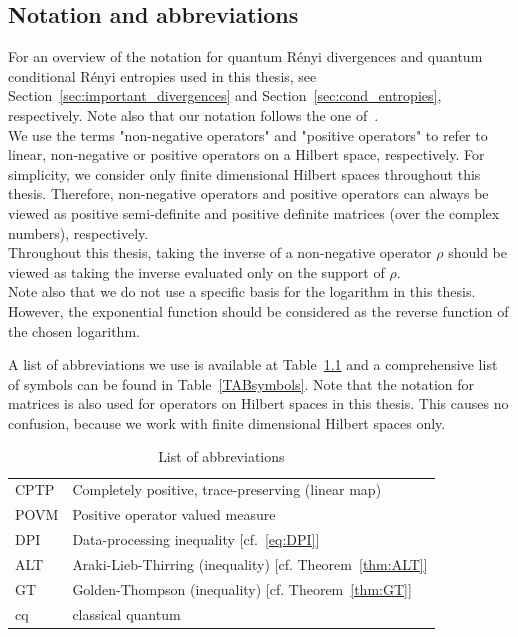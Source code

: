 \documentclass[11pt,a4paper,twoside]{report}
\newcommand{\+}{\textnormal{+} }
\theoremstyle{definition}
\numberwithin{equation}{chapter}
\begin{document}
\begin{appendix}
\chapter{Notation and abbreviations} \label{APPnoation}

For an overview of the notation for quantum R\'enyi divergences and quantum conditional R\'enyi entropies used in this thesis, see Section~\ref{sec:important_divergences} and  Section~\ref{sec:cond_entropies}, respectively. Note also that our notation follows the one of~\cite{tomamichel_quantum_2016}. \\


We use the terms "non-negative operators" and "positive operators" to refer to linear, non-negative or positive operators on a Hilbert space, respectively. For simplicity, we consider only finite dimensional Hilbert spaces throughout this thesis. Therefore, non-negative operators and positive operators can always be viewed as positive semi-definite and positive definite matrices (over the complex numbers), respectively. \\
Throughout this thesis, taking the inverse of a non-negative operator $\rho$ should be viewed as taking the inverse evaluated only on the support of $\rho$.\\


Note also that we do not use a specific basis for the logarithm in this thesis. However, the exponential function should be considered as the reverse function of the chosen logarithm.\\

\vspace{5mm}

\noindent A list of abbreviations we use is available at Table~\ref{TABabbrev} and a comprehensive list of symbols can be found in Table~\ref{TABsymbols}. Note that the notation for matrices is also used for operators on Hilbert spaces in this thesis. This causes no confusion, because we work with finite dimensional Hilbert spaces only. 

\begin{table}[!ht]
\renewcommand{\arraystretch}{1.3}
\caption{List of abbreviations}
\label{TABabbrev}
\centering
\begin{tabular}{l l}
\hline
CPTP & Completely positive, trace-preserving (linear map)\\
POVM & Positive operator valued measure \\
DPI & Data-processing inequality [cf.~\eqref{eq:DPI}]\\
ALT & Araki-Lieb-Thirring (inequality) [cf. Theorem~\ref{thm:ALT}]\\
GT & Golden-Thompson (inequality) [cf. Theorem~\ref{thm:GT}]\\
cq & classical quantum \\
\hline
\end{tabular}
\end{table}


\end{appendix}
\end{document}
